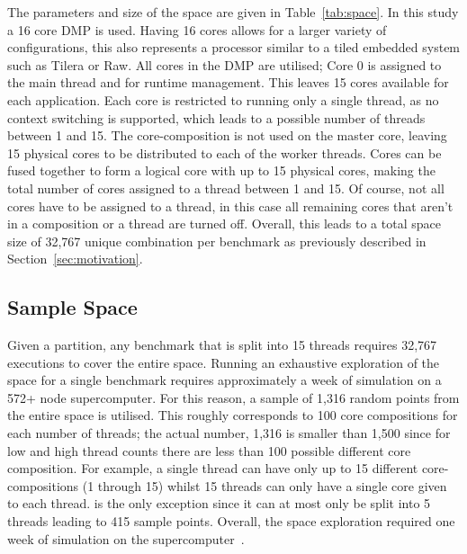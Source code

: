 The parameters and size of the space are given in Table~\ref{tab:space}.
In this study a 16 core DMP is used.
Having 16 cores allows for a larger variety of configurations, this also represents a processor similar to a tiled embedded system such as Tilera or Raw.
All cores in the DMP are utilised; Core 0 is assigned to the main thread and for runtime management.
This leaves 15 cores available for each application.
Each core is restricted to running only a single thread, as no context switching is supported, which leads to a possible number of threads between 1 and 15.
The core-composition is not used on the master core, leaving 15 physical cores to be distributed to each of the worker threads.
Cores can be fused together to form a logical core with up to 15 physical cores, making the total number of cores assigned to a thread between 1 and 15.
Of course, not all cores have to be assigned to a thread, in this case all remaining cores that aren't in a composition or a thread are turned off.
Overall, this leads to a total space size of 32,767 unique combination per benchmark as previously described in Section~\ref{sec:motivation}.

\subsection{Sample Space}


Given a partition, any benchmark that is split into 15 threads requires 32,767 executions to cover the entire space.
Running an exhaustive exploration of the space for a single benchmark requires approximately a week of simulation on a 572+ node supercomputer.
For this reason, a sample of 1,316 random points from the entire space is utilised.
This roughly corresponds to 100 core compositions for each number of threads; the actual number, 1,316 is smaller than 1,500 since for low and high thread counts there are less than 100 possible different core composition.
For example, a single thread can have only up to 15 different core-compositions (1 through 15) whilst 15 threads can only have a single core given to each thread.
 is the only exception since it can at most only be split into 5 threads leading to 415 sample points.
Overall, the space exploration required one week of simulation on the supercomputer~\cite{ecdf}.

